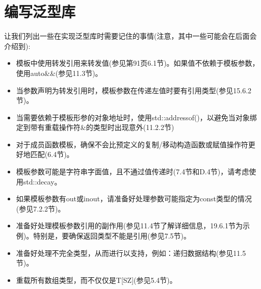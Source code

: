 \section{编写泛型库}
让我们列出一些在实现泛型库时需要记住的事情(注意，其中一些可能会在后面会介绍到):

\begin{itemize}
\item 
模板中使用转发引用来转发值(参见第91页6.1节)。如果值不依赖于模板参数，使用auto\&\&(参见11.3节)。

\item 
当参数声明为转发引用时，模板参数在传递左值时要有引用类型(参见15.6.2节)。

\item 
当需要依赖于模板形参的对象地址时，使用std::addressof()，以避免当对象绑定到带有重载操作符\&的类型时出现意外(11.2.2节)

\item 
对于成员函数模板，确保不会比预定义的复制/移动构造函数或赋值操作符更好地匹配(6.4节)。

\item 
模板参数可能是字符串字面值，且不通过值传递时(7.4节和D.4节)，请考虑使用std::decay。

\item 
如果模板参数有out或inout，请准备好处理参数可能指定为const类型的情况(参见7.2.2节)。

\item 
准备好处理模板参数引用的副作用(参见11.4节了解详细信息，19.6.1节为示例)。特别是，要确保返回类型不能是引用(参见7.5节)。

\item 
准备好处理不完全类型，从而进行以支持，例如：递归数据结构(参见11.5节)。

\item 
重载所有数组类型，而不仅仅是T[SZ](参见5.4节)。
\end{itemize}
